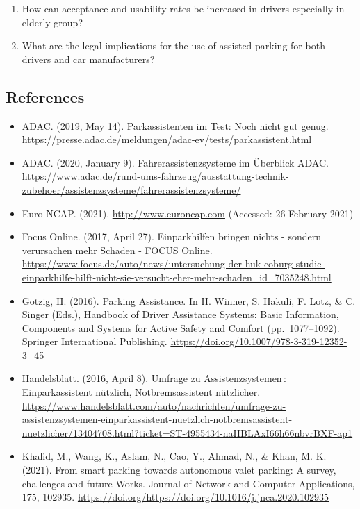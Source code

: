 \documentclass[
]{book}
\providecommand{\tightlist}{%
  \setlength{\itemsep}{0pt}\setlength{\parskip}{0pt}}
\begin{document}
\begin{enumerate}
\def\labelenumi{\arabic{enumi}.}
\tightlist
\item
  How can acceptance and usability rates be increased in drivers especially in elderly group?
\item
  What are the legal implications for the use of assisted parking for both drivers and car manufacturers?
\end{enumerate}

\hypertarget{references-18}{%
\subsection*{References}\label{references-18}}

\begin{itemize}
\tightlist
\item
  ADAC. (2019, May 14). Parkassistenten im Test: Noch nicht gut genug. \url{https://presse.adac.de/meldungen/adac-ev/tests/parkassistent.html}
\item
  ADAC. (2020, January 9). Fahrerassistenzsysteme im Überblick \textbar{} ADAC. \url{https://www.adac.de/rund-ums-fahrzeug/ausstattung-technik-zubehoer/assistenzsysteme/fahrerassistenzsysteme/}
\item
  Euro NCAP. (2021). \url{http://www.euroncap.com} (Accessed: 26 February 2021)
\item
  Focus Online. (2017, April 27). Einparkhilfen bringen nichts - sondern verursachen mehr Schaden - FOCUS Online. \url{https://www.focus.de/auto/news/untersuchung-der-huk-coburg-studie-einparkhilfe-hilft-nicht-sie-versucht-eher-mehr-schaden_id_7035248.html}
\item
  Gotzig, H. (2016). Parking Assistance. In H. Winner, S. Hakuli, F. Lotz, \& C. Singer (Eds.), Handbook of Driver Assistance Systems: Basic Information, Components and Systems for Active Safety and Comfort (pp.~1077--1092). Springer International Publishing. \url{https://doi.org/10.1007/978-3-319-12352-3_45}
\item
  Handelsblatt. (2016, April 8). Umfrage zu Assistenzsystemen\,: Einparkassistent nützlich, Notbremsassistent nützlicher. \url{https://www.handelsblatt.com/auto/nachrichten/umfrage-zu-assistenzsystemen-einparkassistent-nuetzlich-notbremsassistent-nuetzlicher/13404708.html?ticket=ST-4955434-naHBLAxI66h66nbvrBXF-ap1}
\item
  Khalid, M., Wang, K., Aslam, N., Cao, Y., Ahmad, N., \& Khan, M. K. (2021). From smart parking towards autonomous valet parking: A survey, challenges and future Works. Journal of Network and Computer Applications, 175, 102935. \url{https://doi.org/https://doi.org/10.1016/j.jnca.2020.102935}

\end{itemize}
\end{document}
